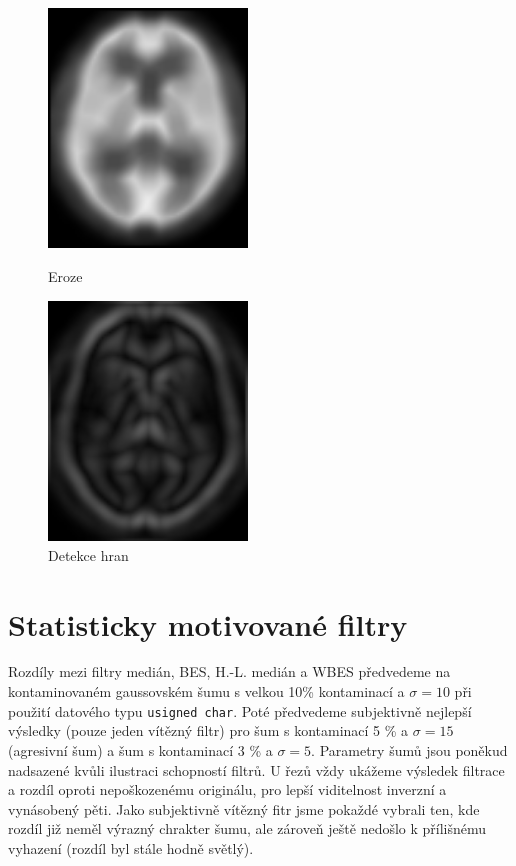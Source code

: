      \begin{figure}[h]
        \begin{minipage}[l]{0.5\textwidth}
            \center
            \includegraphics[width = 150pt]{src/8Appendix/final/eroze.png}
            \caption{Eroze}
        \end{minipage}
        \begin{minipage}[r]{0.5\textwidth}
            \center
            \includegraphics[width = 150pt]{src/8Appendix/final/hrany.png}
            \caption{Detekce hran}
        \end{minipage}
    \end{figure}


    \section{Statisticky motivované filtry}

    Rozdíly mezi filtry medián, BES, H.-L. medián a WBES předvedeme na kontaminovaném gaussovském šumu s velkou 10\% kontaminací a $\sigma = 10$ při použití datového typu {\tt usigned char}. Poté předvedeme subjektivně nejlepší výsledky (pouze jeden vítězný filtr) pro šum s kontaminací 5 \% a $\sigma = 15$ (agresivní šum) a šum s kontaminací 3 \% a $\sigma = 5$. Parametry šumů jsou poněkud nadsazené kvůli ilustraci schopností filtrů. U řezů vždy ukážeme výsledek filtrace a rozdíl oproti nepoškozenému originálu, pro lepší viditelnost inverzní a vynásobený pěti. Jako subjektivně vítězný fitr jsme pokaždé vybrali ten, kde rozdíl již neměl výrazný chrakter šumu, ale zároveň ještě nedošlo k přílišnému vyhazení (rozdíl byl stále hodně světlý).

